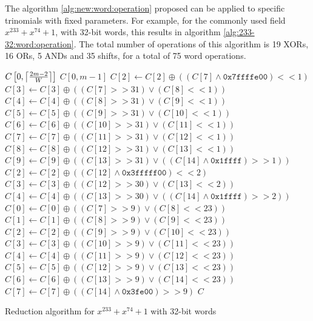 The algorithm \ref{alg:new:word:operation} proposed can be applied to specific trinomials with fixed parameters. For example, for the commonly used field $x^{233} + x^{74} + 1$, with 32-bit words, this results in algorithm \ref{alg:233-32:word:operation}. The total number of operations of this algorithm is 19 XORs, 16 ORs, 5 ANDs and 35 shifts, for a total of 75 word operations.

\begin{algorithm}
\begin{algorithmic}[1]
  \REQUIRE $C\left[0,\ceil*{\frac{2m-2}{W}}\right]$
  \ENSURE $C[0,m-1]$
  \STATE $C[2] \gets C[2] \oplus ((C[7] \land \texttt{0x7ffffe00}) << 1)$
  \STATE $C[3] \gets C[3] \oplus ((C[7] >> 31) \lor (C[8] << 1))$
  \STATE $C[4] \gets C[4] \oplus ((C[8] >> 31) \lor (C[9] << 1))$
  \STATE $C[5] \gets C[5] \oplus ((C[9] >> 31) \lor (C[10] << 1))$
  \STATE $C[6] \gets C[6] \oplus ((C[10] >> 31) \lor (C[11] << 1))$
  \STATE $C[7] \gets C[7] \oplus ((C[11] >> 31) \lor (C[12] << 1))$
  \STATE $C[8] \gets C[8] \oplus ((C[12] >> 31) \lor (C[13] << 1))$
  \STATE $C[9] \gets C[9] \oplus ((C[13] >> 31) \lor ((C[14] \land \texttt{0x1ffff}) >> 1))$
  \STATE $C[2] \gets C[2] \oplus ((C[12] \land \texttt{0x3fffff00}) << 2)$
  \STATE $C[3] \gets C[3] \oplus ((C[12] >> 30) \lor (C[13] << 2))$
  \STATE $C[4] \gets C[4] \oplus ((C[13] >> 30) \lor ((C[14] \land \texttt{0x1ffff}) >> 2))$
  \STATE $C[0] \gets C[0] \oplus ((C[7] >> 9) \lor (C[8] << 23))$
  \STATE $C[1] \gets C[1] \oplus ((C[8] >> 9) \lor (C[9] << 23))$
  \STATE $C[2] \gets C[2] \oplus ((C[9] >> 9) \lor (C[10] << 23))$
  \STATE $C[3] \gets C[3] \oplus ((C[10] >> 9) \lor (C[11] << 23))$
  \STATE $C[4] \gets C[4] \oplus ((C[11] >> 9) \lor (C[12] << 23))$
  \STATE $C[5] \gets C[5] \oplus ((C[12] >> 9) \lor (C[13] << 23))$
  \STATE $C[6] \gets C[6] \oplus ((C[13] >> 9) \lor (C[14] << 23))$
  \STATE $C[7] \gets C[7] \oplus ((C[14] \land \texttt{0x3fe00}) >> 9)$
  \RETURN $C$
  \caption{Reduction algorithm for $x^{233} + x^{74} + 1$ with 32-bit words}
  \label{alg:233-32:word:operation}
\end{algorithmic}
\end{algorithm}